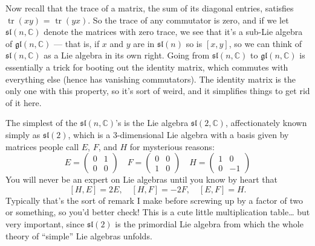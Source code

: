 \documentclass[12pt]{article}
\begin{document}
Now recall that the trace of a matrix, the sum of its diagonal entries,
satisfies \(\operatorname{tr}(xy)\) = \(\operatorname{tr}(yx)\). So the
trace of any commutator is zero, and if we let
\(\mathfrak{sl}(n,\mathbb{C})\) denote the matrices with zero trace, we
see that it's a sub-Lie algebra of \(\mathfrak{gl}(n,\mathbb{C})\) ---
that is, if \(x\) and \(y\) are in \(\mathfrak{sl}(n)\) so is \([x,y]\),
so we can think of \(\mathfrak{sl}(n,\mathbb{C})\) as a Lie algebra in
its own right. Going from \(\mathfrak{sl}(n,\mathbb{C})\) to
\(\mathfrak{gl}(n,\mathbb{C})\) is essentially a trick for booting out
the identity matrix, which commutes with everything else (hence has
vanishing commutators). The identity matrix is the only one with this
property, so it's sort of weird, and it simplifies things to get rid of
it here.

The simplest of the \(\mathfrak{sl}(n,\mathbb{C})\)'s is the Lie algebra
\(\mathfrak{sl}(2,\mathbb{C})\), affectionately known simply as
\(\mathfrak{sl}(2)\), which is a \(3\)-dimensional Lie algebra with a
basis given by matrices people call \(E\), \(F\), and \(H\) for
mysterious reasons:
\[E=\left(\begin{array}{cc}0&1\\0&0\end{array}\right) \quad F=\left(\begin{array}{cc}0&0\\1&0\end{array}\right) \quad H=\left(\begin{array}{cc}1&0\\0&-1\end{array}\right)\]
You will never be an expert on Lie algebras until you know by heart that
\[[H,E] = 2E, \quad [H,F] = -2F, \quad [E,F]  = H.\] Typically that's
the sort of remark I make before screwing up by a factor of two or
something, so you'd better check! This is a cute little multiplication
table\ldots{} but very important, since \(\mathfrak{sl}(2)\) is the
primordial Lie algebra from which the whole theory of ``simple'' Lie
algebras unfolds.
\end{document}

